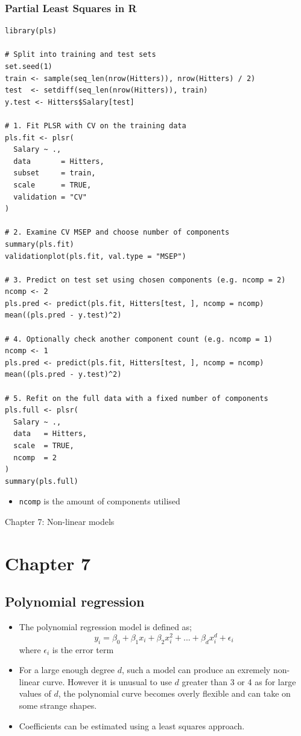 \documentclass{article}
\begin{document}
\subsubsection{Partial Least Squares in R}
\begin{lstlisting}
library(pls)

# Split into training and test sets
set.seed(1)
train <- sample(seq_len(nrow(Hitters)), nrow(Hitters) / 2)
test  <- setdiff(seq_len(nrow(Hitters)), train)
y.test <- Hitters$Salary[test]

# 1. Fit PLSR with CV on the training data
pls.fit <- plsr(
  Salary ~ .,
  data       = Hitters,
  subset     = train,
  scale      = TRUE,
  validation = "CV"
)

# 2. Examine CV MSEP and choose number of components
summary(pls.fit)
validationplot(pls.fit, val.type = "MSEP")

# 3. Predict on test set using chosen components (e.g. ncomp = 2)
ncomp <- 2
pls.pred <- predict(pls.fit, Hitters[test, ], ncomp = ncomp)
mean((pls.pred - y.test)^2)

# 4. Optionally check another component count (e.g. ncomp = 1)
ncomp <- 1
pls.pred <- predict(pls.fit, Hitters[test, ], ncomp = ncomp)
mean((pls.pred - y.test)^2)

# 5. Refit on the full data with a fixed number of components
pls.full <- plsr(
  Salary ~ .,
  data   = Hitters,
  scale  = TRUE,
  ncomp  = 2
)
summary(pls.full)
\end{lstlisting}

\begin{itemize}
    \item \texttt{ncomp} is the amount of components utilised
\end{itemize}

\pagebreak

\begin{center}
    \Large{Chapter 7: Non-linear models}
\end{center}

\section{Chapter 7}

\subsection{Polynomial regression}
\begin{itemize}
    \item The polynomial regression model is defined as;
    \begin{equation*}
        y_i = \beta_0 + \beta_1 x_i + \beta_2 x_i^2 + ... + \beta_d x_i^d +\epsilon_i
    \end{equation*}
    where $\epsilon_i$ is the error term
    \item For a large enough degree $d$, such a model can produce an exremely non-linear curve. However it is unusual to use $d$ greater than 3 or 4 as for large values of $d$, the polynomial curve becomes overly flexible and can take on some strange shapes.
    \item Coefficients can be estimated using a least squares approach.
\end{itemize}
\end{document}
